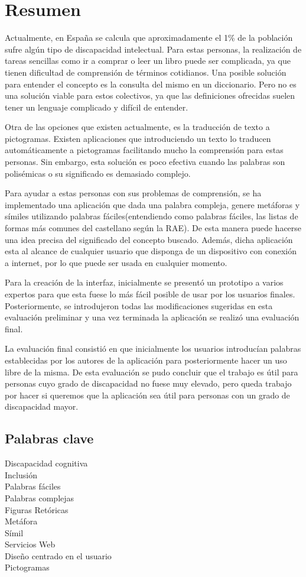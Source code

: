 \chapter*{Resumen}

Actualmente, en España se calcula que aproximadamente el 1\% de la población sufre algún tipo de discapacidad intelectual. Para estas personas, la realización de tareas sencillas como ir a comprar o leer un libro puede ser complicada, ya que tienen dificultad de comprensión de términos cotidianos. Una posible solución para entender el concepto es la consulta del mismo en un diccionario. Pero no es una solución viable para estos colectivos, ya que las definiciones ofrecidas suelen tener un lenguaje complicado y difícil de entender.

Otra de las opciones que existen actualmente, es la traducción de texto a pictogramas. Existen aplicaciones que introduciendo un texto lo traducen automáticamente a pictogramas facilitando mucho la comprensión para estas personas. Sin embargo, esta solución es poco efectiva cuando las palabras son polisémicas o su significado es demasiado complejo.

Para ayudar a estas personas con sus problemas de comprensión, se ha implementado una aplicación que dada una palabra compleja, genere metáforas y símiles utilizando palabras fáciles(entendiendo como palabras fáciles, las listas de formas más comunes del castellano según la RAE). De esta manera puede hacerse una idea precisa del significado del concepto buscado. Además, dicha aplicación esta al alcance de cualquier usuario que disponga de un dispositivo con conexión a internet, por lo que puede ser usada en cualquier momento.

Para la creación de la interfaz, inicialmente se presentó un prototipo a varios expertos para que esta fuese lo más fácil posible de usar por los usuarios finales. Posteriormente, se introdujeron todas las modificaciones sugeridas en esta evaluación preliminar y una vez terminada la aplicación se realizó una evaluación final.

La evaluación final consistió en que inicialmente los usuarios introducían palabras establecidas por los autores de la aplicación para posteriormente hacer un uso libre de la misma. De esta evaluación se pudo concluir que el trabajo es útil para personas cuyo grado de discapacidad no fuese muy elevado, pero queda trabajo por hacer si queremos que la aplicación sea útil para personas con un grado de discapacidad mayor.


\section*{Palabras clave}
   
\noindent Discapacidad cognitiva\\
\noindent Inclusión\\
\noindent Palabras fáciles\\
\noindent Palabras complejas\\
\noindent Figuras Retóricas\\
\noindent Metáfora\\
\noindent Símil\\
\noindent Servicios Web\\
\noindent Diseño centrado en el usuario\\
\noindent Pictogramas\\

   


